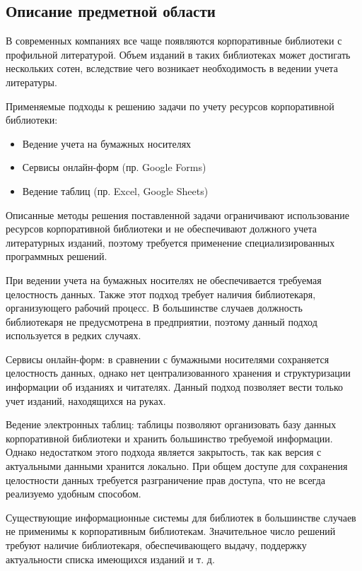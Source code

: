 \documentclass[./intro.tex]{subfiles}
\begin{document}
\subsection{Описание предметной области}
\par 
В современных компаниях все чаще появляются корпоративные библиотеки с профильной литературой.
Объем изданий в таких библиотеках может достигать нескольких сотен, вследствие чего возникает необходимость в ведении учета литературы.
\par
Применяемые подходы к решению задачи по учету ресурсов корпоративной библиотеки:
\begin{itemize}
    \item Ведение учета на бумажных носителях
    \item Сервисы онлайн-форм (пр. Google Forms)
    \item Ведение таблиц (пр. Excel, Google Sheets)
\end{itemize}
\par Описанные методы решения поставленной задачи ограничивают использование ресурсов корпоративной библиотеки и не обеспечивают должного учета литературных изданий, поэтому требуется применение специализированных программных решений.
\par При ведении учета на бумажных носителях не обеспечивается требуемая целостность данных.
Также этот подход требует наличия библиотекаря, организующего рабочий процесс. 
В большинстве случаев должность библиотекаря не предусмотрена в предприятии, поэтому данный подход используется в редких случаях.
\par Сервисы онлайн-форм: в сравнении с бумажными носителями сохраняется целостность данных, однако нет централизованного хранения и структуризации информации об изданиях и читателях.
Данный подход позволяет вести только учет изданий, находящихся на руках.
\par Ведение электронных таблиц: таблицы позволяют организовать базу данных корпоративной библиотеки и хранить большинство требуемой информации. 
Однако недостатком этого подхода является закрытость, так как версия с актуальными данными хранится локально.
При общем доступе для сохранения целостности данных требуется разграничение прав доступа, что не всегда реализуемо удобным способом.
\par 
Существующие информационные системы для библиотек в большинстве случаев не применимы к корпоративным библиотекам.
Значительное число решений требуют наличие библиотекаря, обеспечивающего выдачу, поддержку актуальности списка имеющихся изданий и т. д.
\end{document}
